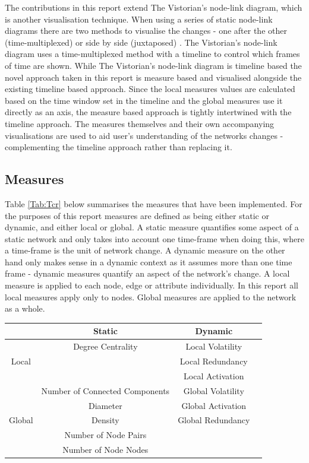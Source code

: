 The contributions in this report extend The Vistorian's node-link diagram, which is another visualisation technique. When using a series of static node-link diagrams there are two methods to visualise the changes - one after the other (time-multiplexed) or side by side (juxtaposed) \cite{vdnwmc}. The Vistorian's node-link diagram uses a time-multiplexed method with a timeline to control which frames of time are shown. While The Vistorian's node-link diagram is timeline based the novel approach taken in this report is measure based and visualised alongside the existing timeline based approach. Since the local measures values are calculated based on the time window set in the timeline and the global measures use it directly as an axis, the measure based approach is tightly intertwined with the timeline approach. The measures themselves and their own accompanying visualisations are used to aid user's understanding of the networks changes - complementing the  timeline approach rather than replacing it.


\subsection{Measures}
Table \ref{Tab:Tcr} below summarises the measures that have been implemented. For the purposes of this report measures are defined as being either static or dynamic, and either local or global. A static measure quantifies some aspect of a static network and only takes into account one time-frame when doing this, where a time-frame is the unit of network change. A dynamic measure on the other hand only makes sense in a dynamic context as it assumes more than one time frame - dynamic measures quantify an aspect of the network's change. A local measure is applied to each node, edge or attribute individually. In this report all local measures apply only to nodes. Global measures are applied to the network as a whole.

\begin{center}
\begin{table}
\begin{tabular}{ |c|c|c|c| } 
\hline
 & Static & Dynamic \\
\hline
\multirow{3}{4em}{Local} & Degree Centrality & Local Volatility \\ 
& & Local Redundancy \\ 
& & Local Activation \\ 
\hline
\multirow{5}{4em}{Global} & Number of Connected Components & Global Volatility \\
 & Diameter & Global Activation \\
 & Density & Global Redundancy  \\
 & Number of Node Pairs &   \\
 & Number of Node Nodes &   \\
\hline
\end{tabular}
\end{table}
\end{center}


